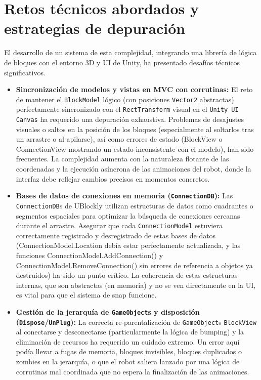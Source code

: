 \section{Retos técnicos abordados y estrategias de depuración}
El desarrollo de un sistema de esta complejidad, integrando una librería de lógica de bloques con el entorno 3D y UI de Unity, ha presentado desafíos técnicos significativos.
\begin{itemize}
	\item \textbf{Sincronización de modelos y vistas en MVC con corrutinas:} El reto de mantener el \texttt{BlockModel} lógico (con posiciones \texttt{Vector2} abstractas) perfectamente sincronizado con el \texttt{RectTransform} visual en el \texttt{Unity UI Canvas} ha requerido una depuración exhaustiva. Problemas de desajustes visuales o saltos en la posición de los bloques (especialmente al soltarlos tras un arrastre o al apilarse), así como errores de estado (BlockView o ConnectionView mostrando un estado inconsistente con el modelo), han sido frecuentes. La complejidad aumenta con la naturaleza flotante de las coordenadas y la ejecución asíncrona de las animaciones del robot, donde la interfaz debe reflejar cambios precisos en momentos concretos.
	
	\item \textbf{Bases de datos de conexiones en memoria (\texttt{ConnectionDB}):} Las \texttt{ConnectionDB}s de UBlockly utilizan estructuras de datos como cuadrantes o segmentos espaciales para optimizar la búsqueda de conexiones cercanas durante el arrastre. Asegurar que cada \texttt{ConnectionModel} estuviera correctamente registrado y desregistrado de estas bases de datos (ConnectionModel.Location debía estar perfectamente actualizada, y las funciones ConnectionModel.AddConnection() y ConnectionModel.RemoveConnection() sin errores de referencia a objetos ya destruidos) ha sido un punto crítico. La coherencia de estas estructuras internas, que son abstractas (en memoria) y no se ven directamente en la UI, es vital para que el sistema de snap funcione.
	
	\item \textbf{Gestión de la jerarquía de \texttt{GameObject}s y disposición (\texttt{Dispose}/\texttt{UnPlug}):} La correcta re-parentalización de \texttt{GameObject}s \texttt{BlockView} al conectarse y desconectarse (particularmente la lógica de bumping) y la eliminación de recursos ha requerido un cuidado extremo. Un error aquí podía llevar a fugas de memoria, bloques invisibles, bloques duplicados o zombies en la jerarquía, o que el robot saliera lanzado por una lógica de corrutinas mal coordinada que no espera la finalización de las animaciones.
	

\end{itemize}
